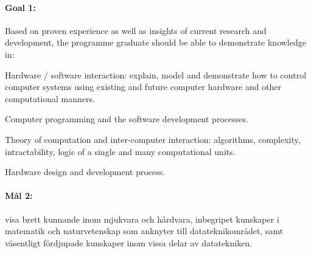 
\paragraph{Goal 1:} Based on proven experience as well as insights of
current research and development, the programme graduate should be
able to demonstrate knowledge in:

Hardware / software interaction: explain, model and demonstrate how to
control computer systems using existing and future computer hardware
and other computational manners.

Computer programming and the software development processes.

Theory of computation and inter-computer interaction: algorithms,
complexity, intractability, logic of a single and many computational
units.

Hardware design and development process. 


% 

\paragraph{Mål 2:} visa brett kunnande inom mjukvara och hårdvara,
inbegripet kunskaper i matematik och naturvetenskap som anknyter till
datateknikområdet, samt väsentligt fördjupade kunskaper inom vissa
delar av datatekniken.


